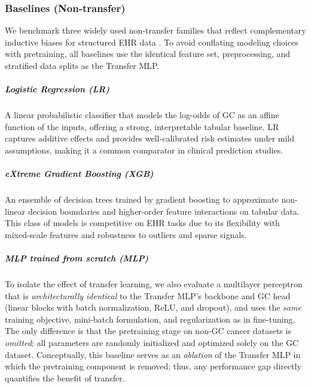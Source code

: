 \documentclass[diagnostics,article,submit,pdftex,moreauthors]{Definitions/mdpi}
\begin{document}


\subsubsection{Baselines (Non-transfer)}
We benchmark three widely used non-transfer families that reflect complementary inductive biases for structured EHR data \citep{EHRBreastRecurrence2023,WANG2023Prostate,park2024SHapley}. To avoid conflating modeling choices with pretraining, all baselines use the identical feature set, preprocessing, and stratified data splits as the Transfer MLP.

\subparagraph{Logistic Regression (LR)}
A linear probabilistic classifier that models the log-odds of GC as an affine function of the inputs, offering a strong, interpretable tabular baseline. LR captures additive effects and provides well-calibrated risk estimates under mild assumptions, making it a common comparator in clinical prediction studies.

\subparagraph{eXtreme Gradient Boosting (XGB)}
An ensemble of decision trees trained by gradient boosting to approximate non-linear decision boundaries and higher-order feature interactions on tabular data. This class of models is competitive on EHR tasks due to its flexibility with mixed-scale features and robustness to outliers and sparse signals.

\subparagraph{MLP trained from scratch (MLP)}
To isolate the effect of transfer learning, we also evaluate a multilayer perceptron that is \emph{architecturally identical} to the Transfer MLP’s backbone and GC head (linear blocks with batch normalization, ReLU, and dropout), and uses the \emph{same} training objective, mini-batch formulation, and regularization as in fine-tuning. The only difference is that the pretraining stage on non-GC cancer datasets is \emph{omitted}: all parameters are randomly initialized and optimized solely on the GC dataset. Conceptually, this baseline serves as an \emph{ablation} of the Transfer MLP in which the pretraining component is removed; thus, any performance gap directly quantifies the benefit of transfer.
\end{document}
